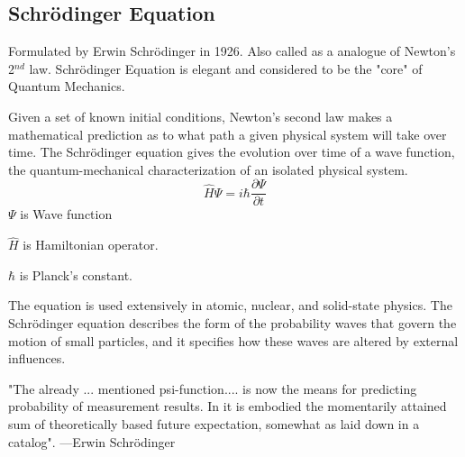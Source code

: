 \subsection{Schrödinger Equation}
Formulated by Erwin Schrödinger in 1926. Also called as a analogue of Newton's 2$^{nd}$ law. Schrödinger Equation is elegant and considered to be the "core" of Quantum Mechanics.

Given a set of known initial conditions, Newton's second law makes a mathematical prediction as to what path a given physical system will take over time. The Schrödinger equation gives the evolution over time of a wave function, the quantum-mechanical characterization of an isolated physical system.
$$ \hat{H} \Psi = i \hbar \frac{\partial \Psi}{\partial t} $$
$\Psi$ is Wave function


$\hat{H}$ is Hamiltonian operator.


$\hbar$ is Planck's constant. 


The equation is used extensively in atomic, nuclear, and solid-state physics. The Schrödinger equation describes the form of the probability waves that govern the motion of small particles, and it specifies how these waves are altered by external influences.

"The already ... mentioned psi-function.... is now the means for predicting probability of measurement results. In it is embodied the momentarily attained sum of theoretically based future expectation, somewhat as laid down in a catalog". —Erwin Schrödinger
